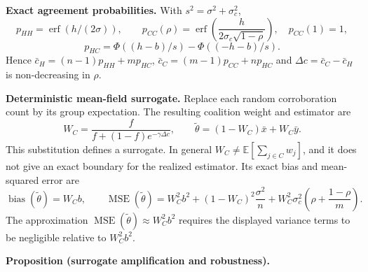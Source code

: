 \documentclass[
  12pt,
]{article}
\begin{document}
\textbf{Exact agreement probabilities.} With
\(s^2=\sigma^2+\sigma_c^2\), \[
p_{HH}=\operatorname{erf}(h/(2\sigma)),\qquad
p_{CC}(\rho)=\operatorname{erf}\!\left(\frac{h}{2\sigma_c\sqrt{1-\rho}}\right),\quad p_{CC}(1)=1,
\] \[
p_{HC}=\Phi((h-b)/s)-\Phi((-h-b)/s).
\] Hence \(\bar c_H=(n-1)p_{HH}+mp_{HC}\),
\(\bar c_C=(m-1)p_{CC}+np_{HC}\) and \(\Delta c=\bar c_C-\bar c_H\) is
non-decreasing in \(\rho\).

\textbf{Deterministic mean-field surrogate.} Replace each random
corroboration count by its group expectation. The resulting coalition
weight and estimator are \[
W_C=\frac{f}{f+(1-f)e^{-\gamma\Delta c}},\qquad
\tilde\theta=(1-W_C)\bar x+W_C\bar y.
\] This substitution defines a surrogate. In general
\(W_C\ne\mathbb E[\sum_{j\in C}w_j]\), and it does not give an exact
boundary for the realized estimator. Its exact bias and mean-squared
error are \[
\operatorname{bias}(\tilde\theta)=W_Cb,\qquad
\operatorname{MSE}(\tilde\theta)=W_C^2b^2+(1-W_C)^2\frac{\sigma^2}{n}
+W_C^2\sigma_c^2\left(\rho+\frac{1-\rho}{m}\right).
\] The approximation
\(\operatorname{MSE}(\tilde\theta)\approx W_C^2b^2\) requires the
displayed variance terms to be negligible relative to \(W_C^2b^2\).

\textbf{Proposition (surrogate amplification and robustness).}
\end{document}
